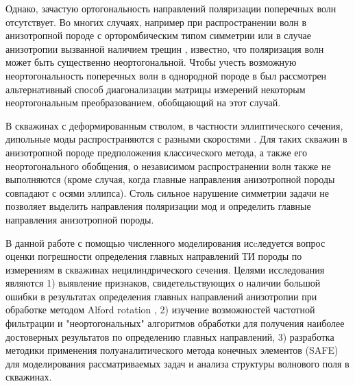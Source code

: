\documentclass[a4paper,11pt]{article}
\begin{document}
Однако, зачастую ортогональность направлений поляризации поперечных волн отсутствует. Во многих случаях, например при распространении волн в анизотропной породе с орторомбическим типом симметрии \cite{Dellinger2001} или в случае анизотропии вызванной наличием трещин \cite{Nolte1996}, известно, что поляризация волн может быть существенно неортогональной.
Чтобы учесть возможную неортогональность поперечных волн в однородной породе в \cite{Dellinger1998} был рассмотрен альтернативный способ диагонализации матрицы измерений некоторым неортогональным преобразованием, обобщающий \cite{Alford1986} на этот случай. %

В скважинах с деформированным стволом, в частности эллиптического сечения, дипольные моды распространяются с разными скоростями \cite{Seroices2010}. Для таких скважин в анизотропной породе предположения классического метода, а также его неортогонального обобщения, о независимом распространении волн также не выполняются (кроме случая, когда главные направления анизотропной породы совпадают с осями эллипса). Столь сильное нарушение симметрии задачи не позволяет выделить направления поляризации мод и определить главные направления анизотропной породы. 

В данной работе с помощью численного моделирования исcледуется вопрос оценки погрешности определения главных направлений ТИ породы по измерениям в скважинах нецилиндрического сечения. Целями исследования являются 1) выявление признаков, свидетельствующих о наличии большой ошибки в результатах определения главных направлений анизотропии при обработке методом Alford rotation%
, 2) изучение возможностей частотной фильтрации и "неортогональных" алгоритмов обработки для получения наиболее достоверных результатов по определению главных направлений, 3) разработка методики применения полуаналитического метода конечных элементов (SAFE) \cite{Bartoli2006} для моделирования рассматриваемых задач и анализа структуры волнового поля в скважинах. %
\end{document}
